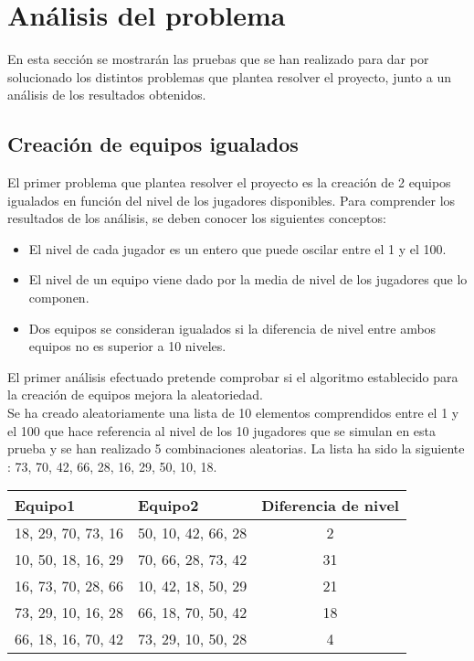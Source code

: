 \chapter{Análisis del problema}
 
En esta sección se mostrarán las pruebas que se han realizado para dar por solucionado los distintos problemas que plantea resolver 
el proyecto, junto a un análisis de los resultados obtenidos.

\section{Creación de equipos igualados}

El primer problema que plantea resolver el proyecto es la creación de 2 equipos igualados en función del nivel de los jugadores disponibles.
Para comprender los resultados de los análisis, se deben conocer los siguientes conceptos:

\begin{itemize}
    \item El nivel de cada jugador es un entero que puede oscilar entre el 1 y el 100.
    \item El nivel de un equipo viene dado por la media de nivel de los jugadores que lo componen.
    \item Dos equipos se consideran igualados si la diferencia de nivel entre ambos equipos no es superior a 10 niveles.
\end{itemize}

\newpage

El primer análisis efectuado pretende comprobar si el algoritmo establecido para la creación de equipos mejora la aleatoriedad.\\

Se ha creado aleatoriamente una lista de 10 elementos comprendidos entre el 1 y el 100 que hace referencia al nivel de los 10 jugadores
que se simulan en esta prueba y se han realizado 5 combinaciones aleatorias. La lista ha sido la siguiente :  73, 70, 42, 66, 28, 16, 29, 50, 10, 18.\\


\begin{tabular}{| l | l | c |}
    \hline
    \textbf{Equipo1} & \textbf{Equipo2} & \textbf{Diferencia de nivel}\\
    \hline
    18, 29, 70, 73, 16 & 50, 10, 42, 66, 28 & 2\\
    \hline
    10, 50, 18, 16, 29 & 70, 66, 28, 73, 42 & 31\\
    \hline
    16, 73, 70, 28, 66 & 10, 42, 18, 50, 29 & 21\\
    \hline
    73, 29, 10, 16, 28 & 66, 18, 70, 50, 42 & 18\\
    \hline
    66, 18, 16, 70, 42 & 73, 29, 10, 50, 28 & 4\\
    \hline
\end{tabular}\\


